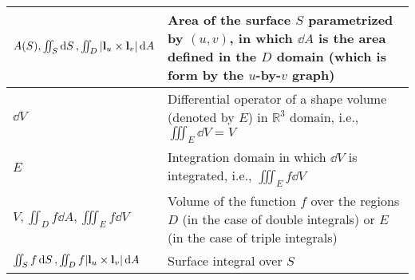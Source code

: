 \documentclass{article}
\begin{document}
\begin{xltabular}{\textwidth}{XX}
	\(A(S), \iint_S \dd{S}, \iint_D \abs{\mathbf{l}_u\times\mathbf{l}_v} \dd{A}\)                                                                                                                                                              & Area of the surface \(S\) parametrized by \((u,v)\), in which \(\dd{A}\) is the area defined in the \(D\) domain (which is form by the \(u\)-by-\(v\) graph)                                                                                                                                                                        \\ \hline
	\(\dd{V}\)                                                                                                                                                                                                                                 & Differential operator of a shape volume (denoted by \(E\)) in \(\mathbb{R}^3\) domain, i.e., \(\iiint_E \dd{V} = V\)                                                                                                                                                                                                                \\ \hline
	\(E\)                                                                                                                                                                                                                                      & Integration domain in which \(\dd{V}\) is integrated, i.e., \(\iiint_E f \dd{V}\) \cite{stewartCalculus2011}                                                                                                                                                                                                                        \\ \hline
	\(V, \iint_D f \dd{A}, \iiint_E f \dd{V}\)                                                                                                                                                                                                 & Volume of the function \(f\) over the regions \(D\) (in the case of double integrals) or \(E\) (in the case of triple integrals)                                                                                                                                                                                                    \\ \hline
	\(\iint_S f \dd{S}, \iint_D f \abs{\mathbf{l}_u\times\mathbf{l}_v} \dd{A}\)                                                                                                                                                                & Surface integral over \(S\)                                                                                                                                                                                                                                                                                                         \\ \hline

\end{xltabular}
\end{document}
